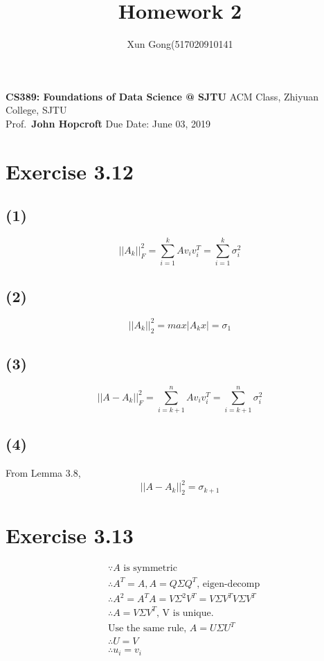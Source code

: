 \documentclass[a4paper, 11pt]{article}
\author{Xun Gong(517020910141}
\title{Homework 2}
\begin{document}
\maketitle

\noindent
\normalsize {\bf CS389: Foundations of Data Science @ SJTU} \hfill ACM Class, Zhiyuan College, SJTU\\
Prof.~{\bf John Hopcroft} \hfill Due Date: June 03, 2019\\

\section*{Exercise 3.12}

\subsection*{(1)}

$$||A_k||_F^2 = \sum_{i=1}^k A v_i v_i^T = \sum_{i=1}^k \sigma_i^2  $$

\subsection*{(2)}

$$||A_k||_2^2 = max|A_k x| = \sigma_1 $$

\subsection*{(3)}

$$||A - A_k||_F^2 = \sum_{i=k+1}^n A v_i v_i^T = \sum_{i=k+1}^n \sigma_i^2 $$

\subsection*{(4)}
From Lemma 3.8, 
$$||A - A_k||_2^2 = \sigma_{k+1} $$

\section*{Exercise 3.13}


\begin{align*}
    & \because   A \text{ is symmetric} \\
    & \therefore A^T = A, A = Q \Sigma Q^T \text{, eigen-decomp} \\
    & \therefore A^2 = A^T A = V\Sigma^2 V^T = V \Sigma V^T V \Sigma V^T \\
    & \therefore A = V \Sigma V^T \text{, V is unique.} \\
    & \text{Use the same rule, } A = U \Sigma U^T \\
    & \therefore U = V \\
    & \therefore u_i = v_i \\
\end{align*}
\end{document}
